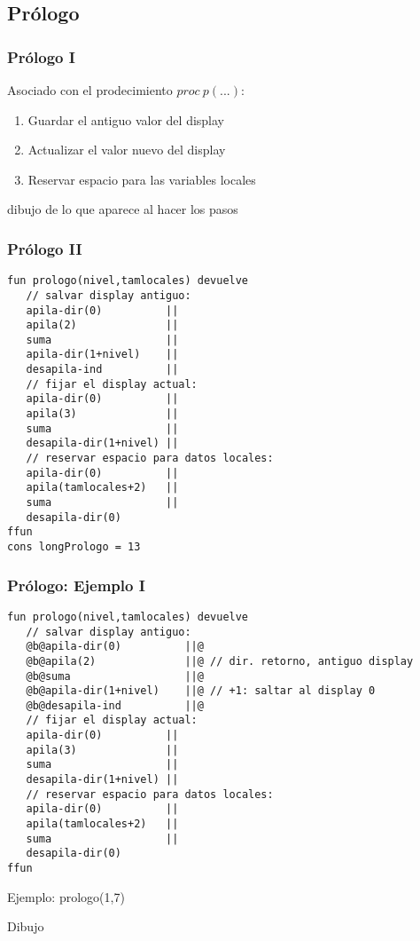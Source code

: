 \documentclass[hyperref={pdfpagelabels=false},tree-dvips]{beamer}
\begin{document}
\subsection{Prólogo}
\begin{frame}[fragile]
\frametitle{Prólogo I}

Asociado con el prodecimiento $proc \ p(...)$:
\begin{enumerate}[<+->]
    \item Guardar el antiguo valor del display
    \item Actualizar el valor nuevo del display
    \item Reservar espacio para las variables locales
\end{enumerate}

dibujo de lo que aparece al hacer los pasos

\end{frame}
\begin{frame}[fragile]
\frametitle{Prólogo II}

\begin{lstlisting}[style=codigoMP,basicstyle=\scriptsize\ttfamily]
fun prologo(nivel,tamlocales) devuelve
   // salvar display antiguo:
   apila-dir(0)          ||
   apila(2)              ||
   suma                  ||
   apila-dir(1+nivel)    ||
   desapila-ind          ||
   // fijar el display actual:
   apila-dir(0)          ||
   apila(3)              ||
   suma                  ||
   desapila-dir(1+nivel) ||
   // reservar espacio para datos locales:
   apila-dir(0)          ||
   apila(tamlocales+2)   ||
   suma                  ||
   desapila-dir(0)
ffun
cons longPrologo = 13
\end{lstlisting}


\end{frame}
\begin{frame}[fragile]
\frametitle{Prólogo: Ejemplo I}

\begin{lstlisting}[style=codigoMP,basicstyle=\tiny\ttfamily]
fun prologo(nivel,tamlocales) devuelve
   // salvar display antiguo:
   @b@apila-dir(0)          ||@
   @b@apila(2)              ||@ // dir. retorno, antiguo display
   @b@suma                  ||@
   @b@apila-dir(1+nivel)    ||@ // +1: saltar al display 0
   @b@desapila-ind          ||@
   // fijar el display actual:
   apila-dir(0)          ||
   apila(3)              ||
   suma                  ||
   desapila-dir(1+nivel) ||
   // reservar espacio para datos locales:
   apila-dir(0)          ||
   apila(tamlocales+2)   ||
   suma                  ||
   desapila-dir(0)
ffun
\end{lstlisting}

Ejemplo: prologo(1,7)

Dibujo

\end{frame}
\end{document}
